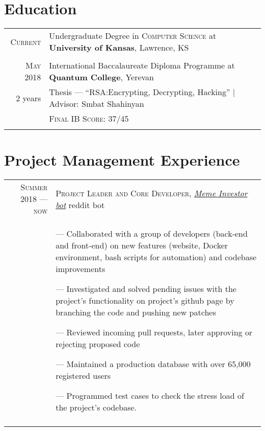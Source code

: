\documentclass[a4paper,10pt]{article}
\begin{document}
\section{Education}
\begin{tabular}{rl}

  \textsc{Current} & Undergraduate Degree in \textsc{Computer Science} at \normalsize\textbf{University of Kansas}, Lawrence, KS\\
  \\
  
  \textsc{May} 2018& International Baccalaureate Diploma Programme at \textbf{Quantum College}, Yerevan\\
  2 years&Thesis --- ``RSA:\@ Encrypting, Decrypting, Hacking'' | Advisor: Smbat Shahinyan\\
                   &\textsc{Final IB Score}: 37/45 \\&\\
  
\end{tabular}

\section{Project Management Experience}
\begin{tabular}{r|p{11cm}}
  \textsc{Summer 2018 --- now} &  \textsc{Project Leader and Core Developer}, \emph{\href{https://github.com/MemeInvestor/memeinvestor_bot}{Meme Investor bot}} reddit bot\\&\footnotesize{
  --- Collaborated with a group of developers (back-end and front-end) on new features (website, Docker environment, bash scripts for automation) and codebase improvements

  --- Investigated and solved pending issues with the project's functionality on project's github page by branching the code and pushing new patches

  --- Reviewed incoming pull requests, later approving or rejecting proposed code

  --- Maintained a production database with over 65,000 registered users

  --- Programmed test cases to check the stress load of the project's codebase.
  } \\\multicolumn{2}{c}{}\\
\end{tabular}
\end{document}

